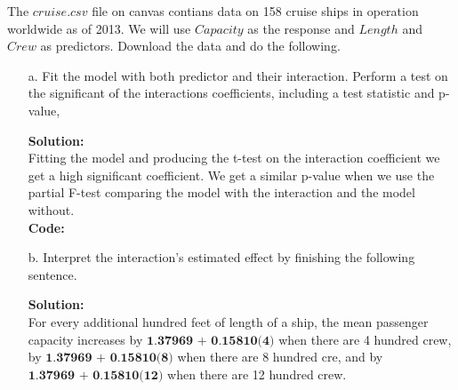 \documentclass[12pt]{article}
\makeatletter
\theoremstyle{homework}
\newenvironment{exercise}[1]
{\def\@currentlabel{#1}\exercisecore}
{\endexercisecore}
\newcommand{\localhead}[1]{\par\smallskip\noindent\textbf{#1}\nobreak\\}%
\newcommand\solution{\localhead{Solution:}}
\makeatother
\begin{document}
 \begin{exercise}{3.} The $cruise.csv$ file on canvas contians data on 158 cruise ships in operation worldwide as of
  2013. We will use $Capacity$ as the response and $Length$ and $Crew$ as predictors. Download the data and do the following.\\
  \begin{enumerate}
    \item[a.] Fit the model with both predictor and their interaction. Perform a test on the significant of the 
    interactions coefficients, including a test statistic and p-value,\\
    \solution Fitting the model and producing the t-test on the interaction coefficient we get a high significant coefficient. We get a 
    similar p-value when we use the partial F-test comparing the model with the interaction and the model without. \\
    \textbf{Code:}
    \begin{center}
    
    \end{center}
    \newpage

    \item[b.] Interpret the interaction's estimated effect by finishing the following sentence. \\
    \solution For every additional hundred feet of length of a ship, the mean passenger capacity increases by $\textbf{1.37969 + 0.15810(4)}$
    when there are 4 hundred crew, by $\textbf{1.37969 + 0.15810(8)}$ when there are 8 hundred cre, and by $\textbf{1.37969 + 0.15810(12)}$ when there are 12 hundred crew. 
    \newpage


\end{enumerate}
\end{exercise}
\end{document}
